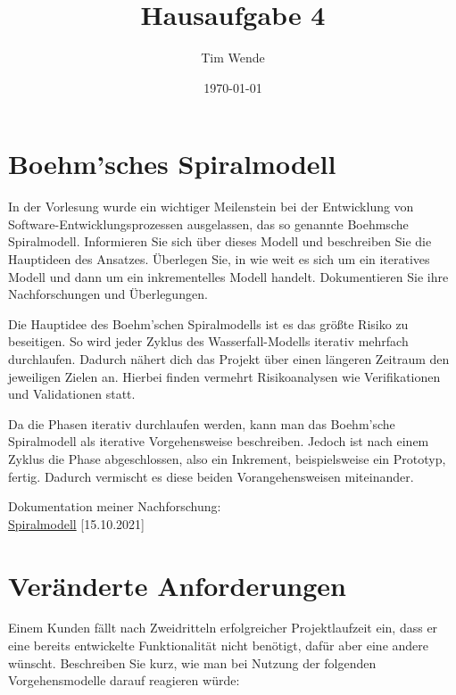 \documentclass{article}
\author{Tim Wende}
\date{\today}
\title{\textbf{Hausaufgabe 4}}
\begin{document}
    \maketitle

    \newpage
    \section{Boehm’sches Spiralmodell}
    In der Vorlesung wurde ein wichtiger Meilenstein bei der Entwicklung von Software-Entwicklungsprozessen ausgelassen, das so genannte Boehmsche Spiralmodell.
    Informieren Sie sich über dieses Modell und beschreiben Sie die Hauptideen des Ansatzes.
    Überlegen Sie, in wie weit es sich um ein iteratives Modell und dann um ein inkrementelles Modell handelt.
    Dokumentieren Sie ihre Nachforschungen und Überlegungen.
    
    \vspace{1em}
    Die Hauptidee des Boehm’schen Spiralmodells ist es das größte Risiko zu beseitigen.
    So wird jeder Zyklus des Wasserfall-Modells iterativ mehrfach durchlaufen.
    Dadurch nähert dich das Projekt über einen längeren Zeitraum den jeweiligen Zielen an.
    Hierbei finden vermehrt Risikoanalysen wie Verifikationen und Validationen statt.

    \vspace{1em}
    Da die Phasen iterativ durchlaufen werden, kann man das Boehm’sche Spiralmodell als iterative Vorgehensweise beschreiben.
    Jedoch ist nach einem Zyklus die Phase abgeschlossen, also ein Inkrement, beispielsweise ein Prototyp, fertig.
    Dadurch vermischt es diese beiden Vorangehensweisen miteinander.

    \vspace{1em}
    Dokumentation meiner Nachforschung:\\
    \href{https://de.wikipedia.org/wiki/Spiralmodell#/}{Spiralmodell} [15.10.2021]

    \newpage
    \section{Veränderte Anforderungen}
    Einem Kunden fällt nach Zweidritteln erfolgreicher Projektlaufzeit ein, dass er eine bereits entwickelte Funktionalität nicht benötigt, dafür aber eine andere wünscht.
    Beschreiben Sie kurz, wie man bei Nutzung der folgenden Vorgehensmodelle darauf reagieren würde:
\end{document}
